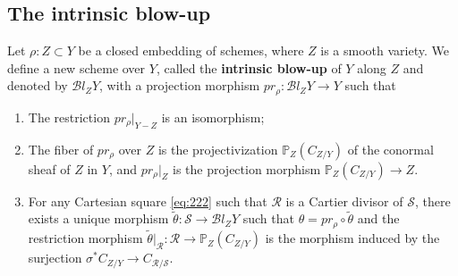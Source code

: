 \documentclass{amsart}
\numberwithin{equation}{section}
\newcommand\mc{\mathcal}
\newcommand\mb{\mathbb}
\theoremstyle{definition}
\theoremstyle{remark}
\begin{document}
\subsection{The intrinsic blow-up}
\label{s27}
Let $\rho:Z\subset Y$ be a closed embedding of schemes, where $Z$ is a smooth variety. We define a new scheme over $Y$, called the \textbf{intrinsic blow-up} of $Y$ along $Z$ and denoted by $\mc{B}l_{Z}Y$, with a projection morphism $pr_{\rho}:\mc{B}l_{Z}Y\to Y$ such that 
\begin{enumerate}[leftmargin=*]
  \item The restriction $pr_{\rho}|_{Y-Z}$ is an isomorphism;
  \item The fiber of $pr_{\rho}$ over $Z$ is the projectivization $\mb{P}_{Z}(C_{Z/Y})$ of the conormal sheaf of $Z$ in $Y$, and $pr_{\rho}|_Z$ is the projection morphism $\mb{P}_{Z}(C_{Z/Y})\to Z$.
  \item For any Cartesian square \cref{eq:222} such that $\mc{R}$ is a Cartier divisor of $\mc{S}$, there exists a unique morphism $\tilde{\theta}:\mc{S}\to \mc{B}l_{Z}Y$ such that $\theta=pr_{\rho}\circ\tilde{\theta}$ and the restriction morphism $\tilde{\theta}|_{\mc{R}}:\mc{R}\to \mb{P}_{Z}(C_{Z/Y})$ is the morphism induced by the surjection $\sigma^{*}C_{Z/Y}\to C_{\mc{R}/\mc{S}}$.
\end{enumerate}
\end{document}

